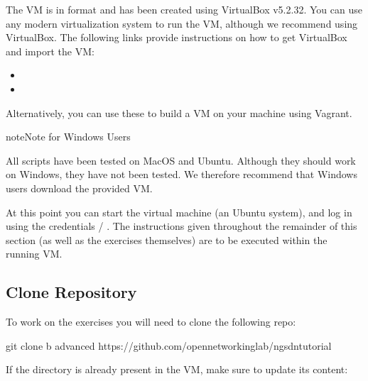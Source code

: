 \documentclass[letterpaper,11pt,english]{sphinxmanual}
\begin{document}
The VM is in  format and has been created using VirtualBox
v5.2.32. You can use any modern virtualization system to run the VM,
although we recommend using VirtualBox. The following links provide
instructions on how to get VirtualBox and import the VM:
\begin{itemize}
\item {} 

\item {} 

\end{itemize}

Alternatively, you can use these
to build a VM on your machine using Vagrant.

\label{\detokenize{exercises:warning-windows}}
\begin{sphinxadmonition}{note}{Note for Windows Users}

All scripts have been tested on MacOS and Ubuntu.  Although they
should work on Windows, they have not been tested. We therefore
recommend that Windows users download the provided VM.
\end{sphinxadmonition}

At this point you can start the virtual machine (an Ubuntu system),
and log in using the credentials  / . The instructions
given throughout the remainder of this section (as well as the
exercises themselves) are to be executed within the running VM.


\subsection{Clone Repository}
\label{\detokenize{exercises:clone-repository}}
To work on the exercises you will need to clone the following repo:

\begin{sphinxVerbatim}[commandchars=\\\{\}]
\PYGZdl{}  \PYGZti{}
\PYGZdl{} git clone \PYGZhy{}b advanced https://github.com/opennetworkinglab/ngsdn\PYGZhy{}tutorial
\end{sphinxVerbatim}

If the  directory is already present in the VM, make
sure to update its content:
\end{document}
